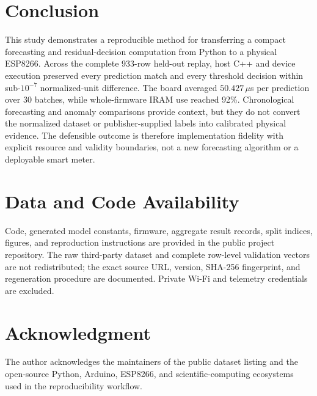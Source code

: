 \documentclass[10pt,a4paper,twocolumn]{article}
\begin{document}
\section{Conclusion}
This study demonstrates a reproducible method for transferring a compact forecasting and residual-decision computation from Python to a physical ESP8266. Across the complete 933-row held-out replay, host C++ and device execution preserved every prediction match and every threshold decision within sub-$10^{-7}$ normalized-unit difference. The board averaged $50.427\,\mu$s per prediction over 30 batches, while whole-firmware IRAM use reached 92\%. Chronological forecasting and anomaly comparisons provide context, but they do not convert the normalized dataset or publisher-supplied labels into calibrated physical evidence. The defensible outcome is therefore implementation fidelity with explicit resource and validity boundaries, not a new forecasting algorithm or a deployable smart meter.

\section*{Data and Code Availability}
Code, generated model constants, firmware, aggregate result records, split indices, figures, and reproduction instructions are provided in the public project repository. The raw third-party dataset and complete row-level validation vectors are not redistributed; the exact source URL, version, SHA-256 fingerprint, and regeneration procedure are documented. Private Wi-Fi and telemetry credentials are excluded.

\section*{Acknowledgment}
The author acknowledges the maintainers of the public dataset listing and the open-source Python, Arduino, ESP8266, and scientific-computing ecosystems used in the reproducibility workflow.

\clearpage


\end{document}
